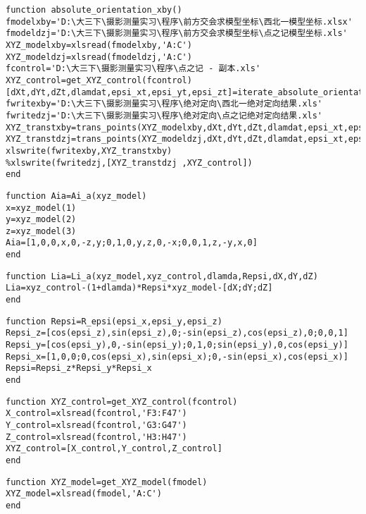 \begin{lstlisting}[caption=absolute\_orientation\_xby.m]
function absolute_orientation_xby()
fmodelxby='D:\大三下\摄影测量实习\程序\前方交会求模型坐标\西北一模型坐标.xlsx'
fmodeldzj='D:\大三下\摄影测量实习\程序\前方交会求模型坐标\点之记模型坐标.xls'
XYZ_modelxby=xlsread(fmodelxby,'A:C')
XYZ_modeldzj=xlsread(fmodeldzj,'A:C')
fcontrol='D:\大三下\摄影测量实习\程序\点之记 - 副本.xls'
XYZ_control=get_XYZ_control(fcontrol)
[dXt,dYt,dZt,dlamdat,epsi_xt,epsi_yt,epsi_zt]=iterate_absolute_orientation(XYZ_modeldzj,XYZ_control,0,0,0,0,0,0,0)
fwritexby='D:\大三下\摄影测量实习\程序\绝对定向\西北一绝对定向结果.xls'
fwritedzj='D:\大三下\摄影测量实习\程序\绝对定向\点之记绝对定向结果.xls'
XYZ_transtxby=trans_points(XYZ_modelxby,dXt,dYt,dZt,dlamdat,epsi_xt,epsi_yt,epsi_zt)
XYZ_transtdzj=trans_points(XYZ_modeldzj,dXt,dYt,dZt,dlamdat,epsi_xt,epsi_yt,epsi_zt)
xlswrite(fwritexby,XYZ_transtxby)
%xlswrite(fwritedzj,[XYZ_transtdzj ,XYZ_control])
end
\end{lstlisting}

\begin{lstlisting}[caption=Ai\_a.m]
function Aia=Ai_a(xyz_model)
x=xyz_model(1)
y=xyz_model(2)
z=xyz_model(3)
Aia=[1,0,0,x,0,-z,y;0,1,0,y,z,0,-x;0,0,1,z,-y,x,0]
end
\end{lstlisting}

\begin{lstlisting}[caption=Li\_a.m]
function Lia=Li_a(xyz_model,xyz_control,dlamda,Repsi,dX,dY,dZ)
Lia=xyz_control-(1+dlamda)*Repsi*xyz_model-[dX;dY;dZ]
end
\end{lstlisting}

\begin{lstlisting}[caption=R\_epsi.m]
function Repsi=R_epsi(epsi_x,epsi_y,epsi_z)
Repsi_z=[cos(epsi_z),sin(epsi_z),0;-sin(epsi_z),cos(epsi_z),0;0,0,1]
Repsi_y=[cos(epsi_y),0,-sin(epsi_y);0,1,0;sin(epsi_y),0,cos(epsi_y)]
Repsi_x=[1,0,0;0,cos(epsi_x),sin(epsi_x);0,-sin(epsi_x),cos(epsi_x)]
Repsi=Repsi_z*Repsi_y*Repsi_x
end
\end{lstlisting}

\begin{lstlisting}[caption=get\_XYZ\_control.m]
function XYZ_control=get_XYZ_control(fcontrol)
X_control=xlsread(fcontrol,'F3:F47')
Y_control=xlsread(fcontrol,'G3:G47')
Z_control=xlsread(fcontrol,'H3:H47')
XYZ_control=[X_control,Y_control,Z_control]
end
\end{lstlisting}

\begin{lstlisting}[caption=get\_XYZ\_model.m]
function XYZ_model=get_XYZ_model(fmodel)
XYZ_model=xlsread(fmodel,'A:C')
end
\end{lstlisting}

